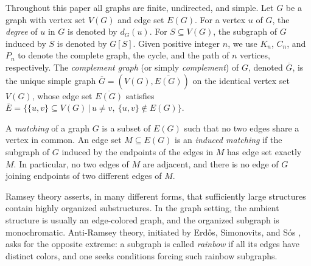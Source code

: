 \documentclass[11pt,a4paper]{article}
\begin{document}
Throughout this paper all graphs are finite, undirected, and simple.   
Let $G$ be a graph with vertex set $V(G)$ and edge set $E(G)$.  
For a vertex $u$ of $G$, the \emph{degree} of $u$ in $G$ is denoted by $d_G(u)$.  
For $S\subseteq V(G)$, the subgraph of $G$ induced by $S$ is denoted by $G[S]$.
 Given  positive integer $n$,  we use  $K_n$, $C_n$, and $P_n$ to denote the complete graph, the cycle, and the path of $n$ vertices, respectively. 
The \textit{complement graph} (or simply \textit{complement}) of $G$, denoted $\overline{G}$, is the unique simple graph $\overline{G} = (V(G), \overline{E(G)})$ on the identical vertex set $V(G)$, whose edge set $\overline{E(G)}$ satisfies
$
\overline{E} = \bigl\{ \{u,v\} \subseteq V(G) \,\big|\, u \neq v,\ \{u,v\} \notin E(G) \bigr\}.
$



A \emph{matching} of a graph $G$ is a  subset of $E(G)$ such that no two edges share a vertex in common.
An edge set $M\subseteq E(G)$ is an \emph{induced matching} if the subgraph of
$G$ induced by the endpoints of the edges in $M$ has edge set exactly $M$.  In
particular, no two edges of $M$ are adjacent, and there is no edge of $G$ joining
endpoints of two different edges of $M$.



Ramsey theory asserts, in many different forms, that sufficiently large structures contain highly organized substructures. 
In the graph setting, the ambient structure is usually an edge-colored graph, and the organized subgraph is monochromatic. Anti-Ramsey theory, initiated by Erd\H{o}s, Simonovits, and S\'{o}s \cite{Erd3}, asks for the opposite extreme: a subgraph is called \textit{rainbow} if all its edges have distinct colors, and one seeks conditions forcing such rainbow subgraphs.
\end{document}
